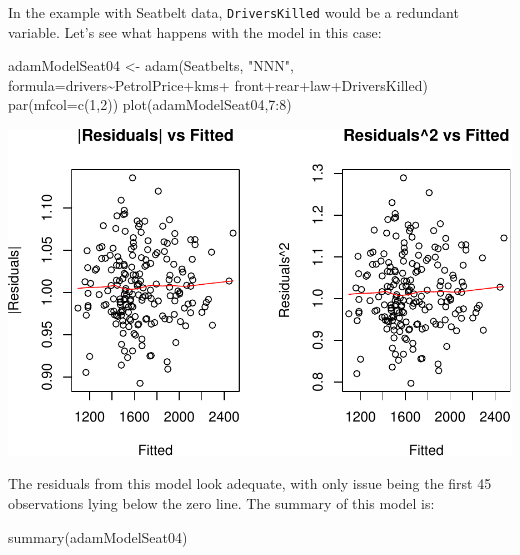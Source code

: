 \documentclass[
]{book}
\newenvironment{Shaded}{\begin{snugshade}}{\end{snugshade}}
\newcommand{\AttributeTok}[1]{\textcolor[rgb]{0.77,0.63,0.00}{#1}}
\newcommand{\DecValTok}[1]{\textcolor[rgb]{0.00,0.00,0.81}{#1}}
\newcommand{\FunctionTok}[1]{\textcolor[rgb]{0.00,0.00,0.00}{#1}}
\newcommand{\NormalTok}[1]{#1}
\newcommand{\OtherTok}[1]{\textcolor[rgb]{0.56,0.35,0.01}{#1}}
\newcommand{\SpecialCharTok}[1]{\textcolor[rgb]{0.00,0.00,0.00}{#1}}
\newcommand{\StringTok}[1]{\textcolor[rgb]{0.31,0.60,0.02}{#1}}
\theoremstyle{definition}
\theoremstyle{definition}
\theoremstyle{definition}
\theoremstyle{definition}
\theoremstyle{remark}
\begin{document}
In the example with Seatbelt data, \texttt{DriversKilled} would be a redundant variable. Let's see what happens with the model in this case:

\begin{Shaded}
\begin{Highlighting}[]
\NormalTok{adamModelSeat04 }\OtherTok{\textless{}{-}} \FunctionTok{adam}\NormalTok{(Seatbelts, }\StringTok{"NNN"}\NormalTok{, }
                        \AttributeTok{formula=}\NormalTok{drivers}\SpecialCharTok{\textasciitilde{}}\NormalTok{PetrolPrice}\SpecialCharTok{+}\NormalTok{kms}\SpecialCharTok{+}
\NormalTok{                          front}\SpecialCharTok{+}\NormalTok{rear}\SpecialCharTok{+}\NormalTok{law}\SpecialCharTok{+}\NormalTok{DriversKilled)}
\FunctionTok{par}\NormalTok{(}\AttributeTok{mfcol=}\FunctionTok{c}\NormalTok{(}\DecValTok{1}\NormalTok{,}\DecValTok{2}\NormalTok{))}
\FunctionTok{plot}\NormalTok{(adamModelSeat04,}\DecValTok{7}\SpecialCharTok{:}\DecValTok{8}\NormalTok{)}
\end{Highlighting}
\end{Shaded}

\includegraphics{adam_files/figure-latex/unnamed-chunk-128-1.pdf}

The residuals from this model look adequate, with only issue being the first 45 observations lying below the zero line. The summary of this model is:

\begin{Shaded}
\begin{Highlighting}[]
\FunctionTok{summary}\NormalTok{(adamModelSeat04)}
\end{Highlighting}
\end{Shaded}
\end{document}
